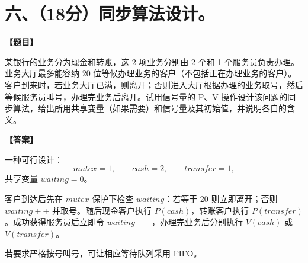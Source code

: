 \documentclass[UTF8,12pt]{ctexart}
\newenvironment{question}{\par\medskip\noindent\textbf{【题目】}\par\smallskip}{\par\medskip}
\newenvironment{answer}{\par\noindent\textbf{【答案】}\par\smallskip}{\par}
\begin{document}
\section*{六、（18分）同步算法设计。}

\begin{question}
某银行的业务分为现金和转账，这 2 项业务分别由 2 个和 1 个服务员负责办理。业务大厅最多能容纳 20 位等候办理业务的客户（不包括正在办理业务的客户）。客户到来时，若业务大厅已满，则离开；否则进入大厅根据办理的业务取号，然后等候服务员叫号，办理完业务后离开。试用信号量的 P、V 操作设计该问题的同步算法，给出所用共享变量（如果需要）和信号量及其初始值，并说明各自的含义。
\end{question}

\begin{answer}
一种可行设计：
\[
mutex=1,\qquad cash=2,\qquad transfer=1,
\]
共享变量 $waiting=0$。

客户到达后先在 $mutex$ 保护下检查 $waiting$：若等于 20 则立即离开；否则 $waiting++$ 并取号。随后现金客户执行 $P(cash)$，转账客户执行 $P(transfer)$。成功获得服务员后立即令 $waiting--$，办理完业务后分别执行 $V(cash)$ 或 $V(transfer)$。

若要求严格按号叫号，可让相应等待队列采用 FIFO。
\end{answer}
\end{document}
